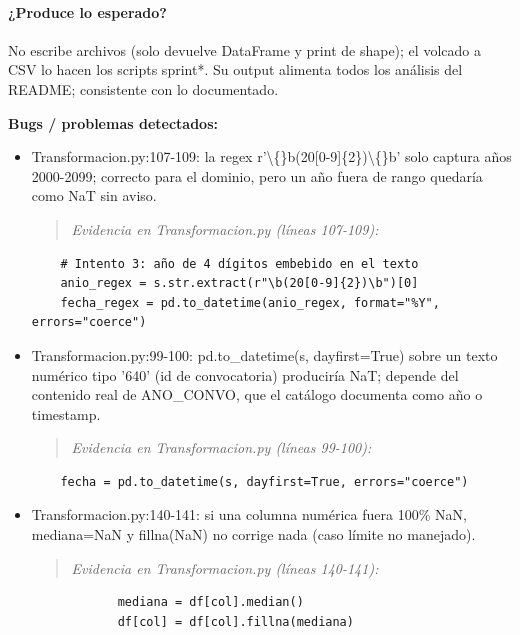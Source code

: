 \paragraph{¿Produce lo esperado?}
No escribe archivos (solo devuelve DataFrame y print de shape); el volcado a CSV lo hacen los scripts sprint*. Su output alimenta todos los análisis del README; consistente con lo documentado.

\begin{tcolorbox}[riesgo]
\textbf{Bugs / problemas detectados:}
\begin{itemize}
  \item Transformacion.py:107-109: la regex r'\textbackslash\{\}b(20[0-9]\{2\})\textbackslash\{\}b' solo captura años 2000-2099; correcto para el dominio, pero un año fuera de rango quedaría como NaT sin aviso.
\begin{quote}\footnotesize\ttfamily
\noindent\emph{Evidencia en Transformacion.py (líneas 107-109):}
\end{quote}
\begin{lstlisting}
    # Intento 3: año de 4 dígitos embebido en el texto
    anio_regex = s.str.extract(r"\b(20[0-9]{2})\b")[0]
    fecha_regex = pd.to_datetime(anio_regex, format="%Y", errors="coerce")
\end{lstlisting}

  \item Transformacion.py:99-100: pd.to\_datetime(s, dayfirst=True) sobre un texto numérico tipo '640' (id de convocatoria) produciría NaT; depende del contenido real de ANO\_CONVO, que el catálogo documenta como año o timestamp.
\begin{quote}\footnotesize\ttfamily
\noindent\emph{Evidencia en Transformacion.py (líneas 99-100):}
\end{quote}
\begin{lstlisting}
    fecha = pd.to_datetime(s, dayfirst=True, errors="coerce")

\end{lstlisting}

  \item Transformacion.py:140-141: si una columna numérica fuera 100\% NaN, mediana=NaN y fillna(NaN) no corrige nada (caso límite no manejado).
\begin{quote}\footnotesize\ttfamily
\noindent\emph{Evidencia en Transformacion.py (líneas 140-141):}
\end{quote}
\begin{lstlisting}
            mediana = df[col].median()
            df[col] = df[col].fillna(mediana)
\end{lstlisting}

\end{itemize}
\end{tcolorbox}

